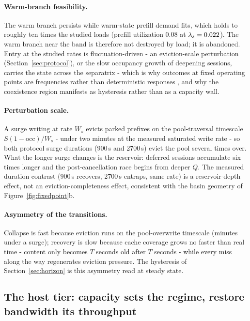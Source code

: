 \paragraph{Warm-branch feasibility.} The warm branch persists while warm-state
prefill demand fits, which holds to roughly ten times the studied
loads (prefill utilization 0.08 at $\lambda_s = 0.022$). The warm
branch near the band is therefore not destroyed by load; it is
abandoned. Entry at the studied rates is fluctuation-driven - an
eviction-scale perturbation (Section~\ref{sec:protocol}), or the slow occupancy
growth of deepening sessions, carries the state across the
separatrix - which is why outcomes at fixed operating points are
frequencies rather than deterministic responses , and why
the coexistence region manifests as hysteresis rather than as a
capacity wall.

\paragraph{Perturbation scale.} A surge writing at rate $W_s$ evicts parked
prefixes on the pool-traversal timescale $S (1 - \mathrm{occ}) / W_s$ - under
two minutes at the measured saturated write rate - so both protocol
surge durations (900\,s and 2700\,s) evict the pool several times
over. What the longer surge changes is the reservoir: deferred
sessions accumulate six times longer and the post-cancellation race
begins from deeper $Q$. The measured duration contrast (900\,s
recovers, 2700\,s entraps, same rate)  is a reservoir-depth
effect, not an eviction-completeness effect, consistent with the
basin geometry of Figure~\ref{fig:fixedpoint}b.

\paragraph{Asymmetry of the transitions.} Collapse is fast because eviction runs
on the pool-overwrite timescale (minutes under a surge); recovery is
slow because cache coverage grows no faster than real time - content
only becomes $T$ seconds old after $T$ seconds - while every miss along
the way regenerates eviction pressure. The hysteresis of Section~\ref{sec:horizon}
is this asymmetry read at steady state.

\subsection{The host tier: capacity sets the regime, restore bandwidth its throughput}
\label{sec:tier-theory}

